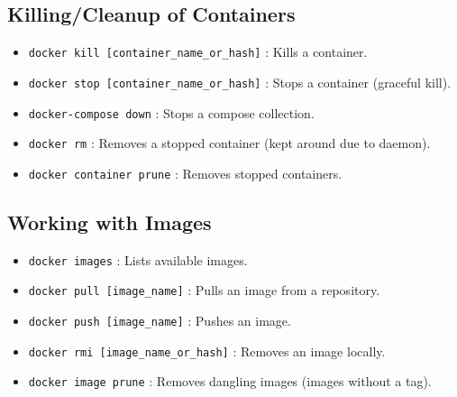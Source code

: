 \documentclass[legal,12pt,oneside,pdflatex,final,twocolumn]{article}
\begin{document}
\subsection{Killing/Cleanup of Containers}
\begin{itemize}
  \item \texttt{docker kill [container_name_or_hash]} : Kills a container.
  \item \texttt{docker stop [container_name_or_hash]} : Stops a container (graceful kill).
  \item \texttt{docker-compose down} : Stops a compose collection.
  \item \texttt{docker rm} : Removes a stopped container (kept around due to daemon).
  \item \texttt{docker container prune} : Removes stopped containers.
\end{itemize}
\subsection{Working with Images}
\begin{itemize}
  \item \texttt{docker images} : Lists available images.
  \item \texttt{docker pull [image_name]} : Pulls an image from a repository.
  \item \texttt{docker push [image_name]} : Pushes an image.
  \item \texttt{docker rmi [image_name_or_hash]} : Removes an image locally.
  \item \texttt{docker image prune} : Removes dangling images (images without a tag).
\end{itemize}
\end{document}
